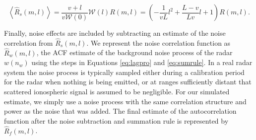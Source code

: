 \documentclass[draft,ras]{agutex}
\begin{document}
\begin{article}
\begin{equation}
\label{eq:sumruleest}
\left\langle\widehat{R}_s(m,l) \right\rangle  =\frac{v+l}{v\mathcal{W}(0)}\mathcal{W}(l)R(m,l) =\left(-\frac{1}{vL}l^2+\frac{L-v}{Lv}l+1\right)   R(m,l).
\end{equation}





Finally, noise effects are included by subtracting an estimate of the noise correlation from $\widehat{R}_s(m,l)$.  We represent the noise correlation function as $\widehat{R}_w(m,l)$, the ACF estimate of the background noise process of the radar $w(n_w)$ using the steps in Equations \ref{eq:lagpro} and \ref{eq:sumrule}. In a real radar system the noise process is typically sampled either during a calibration period for the radar when nothing is being emitted, or at ranges sufficiently distant that scattered ionospheric signal is assumed to be negligible. For our simulated estimate, we simply use a noise process with the same correlation structure and power as the noise that was added. The final estimate of the autocorrelation function after the noise subtraction and summation rule is represented by $\widehat{R}_f(m,l)$.



\end{article}
\end{document}
